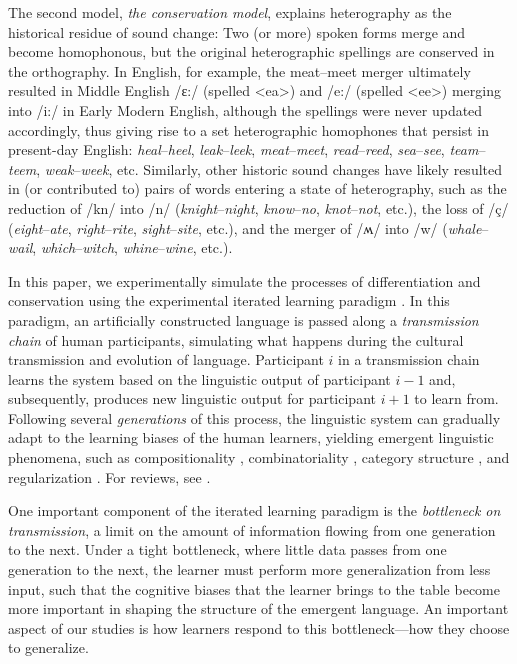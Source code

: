 \documentclass[doc,biblatex]{apa7}
\begin{document}
The second model, \textit{the conservation model}, explains heterography as the historical residue of sound change: Two (or more) spoken forms merge and become homophonous, but the original heterographic spellings are conserved in the orthography. In English, for example, the meat--meet merger ultimately resulted in Middle English /ɛ:/ (spelled <ea>) and /e:/ (spelled <ee>) merging into /i:/ in Early Modern English, although the spellings were never updated accordingly, thus giving rise to a set heterographic homophones that persist in present-day English: \textit{heal}--\textit{heel}, \textit{leak}--\textit{leek}, \textit{meat}--\textit{meet}, \textit{read}--\textit{reed}, \textit{sea}--\textit{see}, \textit{team}--\textit{teem}, \textit{weak}--\textit{week}, etc. Similarly, other historic sound changes have likely resulted in (or contributed to) pairs of words entering a state of heterography, such as the reduction of /kn/ into /n/ (\textit{knight}--\textit{night}, \textit{know}--\textit{no}, \textit{knot}--\textit{not}, etc.), the loss of /ç/ (\textit{eight}--\textit{ate}, \textit{right}--\textit{rite}, \textit{sight}--\textit{site}, etc.), and the merger of /ʍ/ into /w/ (\textit{whale}--\textit{wail}, \textit{which}--\textit{witch}, \textit{whine}--\textit{wine}, etc.).

In this paper, we experimentally simulate the processes of differentiation and conservation using the experimental iterated learning paradigm \parencite{Kirby:2008}. In this paradigm, an artificially constructed language is passed along a \textit{transmission chain} of human participants, simulating what happens during the cultural transmission and evolution of language. Participant $i$ in a transmission chain learns the system based on the linguistic output of participant $i-1$ and, subsequently, produces new linguistic output for participant $i+1$ to learn from. Following several \textit{generations} of this process, the linguistic system can gradually adapt to the learning biases of the human learners, yielding emergent linguistic phenomena, such as compositionality \parencite{Kirby:2008, Kirby:2015, Beckner:2017}, combinatoriality \parencite{Verhoef:2015}, category structure \parencite{Carr:2017, Canini:2014, Silvey:2019}, and regularization \parencite{Smith:2010, Ferdinand:2019}. For reviews, see \textcite{Tamariz:2017, Kirby:2014, ScottPhillips:2010}.

One important component of the iterated learning paradigm is the \textit{bottleneck on transmission}, a limit on the amount of information flowing from one generation to the next. Under a tight bottleneck, where little data passes from one generation to the next, the learner must perform more generalization from less input, such that the cognitive biases that the learner brings to the table become more important in shaping the structure of the emergent language. An important aspect of our studies is how learners respond to this bottleneck---how they choose to generalize.
\end{document}
